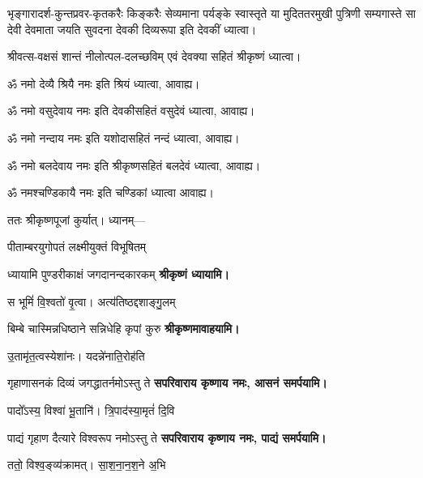 \begin{center}

{भृङ्गारादर्श-कुन्तप्रवर-कृतकरैः किङ्करैः सेव्यमाना}
{पर्यङ्के स्वास्तृते या मुदिततरमुखी पुत्रिणी सम्यगास्ते}
{सा देवी देवमाता जयति सुवदना देवकी दिव्यरूपा}
इति देवकीं ध्यात्वा।

{श्रीवत्स-वक्षसं शान्तं नीलोत्पल-दलच्छविम्}
एवं देवक्या सहितं श्रीकृष्णं ध्यात्वा।

ॐ नमो देव्यै श्रियै नमः इति श्रियं ध्यात्वा, आवाह्य।

ॐ नमो वसुदेवाय नमः इति देवकीसहितं वसुदेवं ध्यात्वा, आवाह्य।

ॐ नमो नन्दाय नमः इति यशोदासहितं नन्दं ध्यात्वा, आवाह्य।

ॐ नमो बलदेवाय नमः इति श्रीकृष्णसहितं बलदेवं ध्यात्वा, आवाह्य।

ॐ नमश्चण्डिकायै नमः इति चण्डिकां ध्यात्वा आवाह्य।

ततः श्रीकृष्णपूजां कुर्यात्। ध्यानम्—

\renewcommand{\devAya}{सपरिवाराय कृष्णाय नमः,}
\medskip

{पीताम्बरयुगोपतं लक्ष्मीयुक्तं विभूषितम्}

{ध्यायामि पुण्डरीकाक्षं जगदानन्दकारकम्}
\medskip
\textbf{श्रीकृष्णं ध्यायामि।}

{स भूमिं॑ वि॒श्वतो॑ वृ॒त्वा। अत्य॑तिष्ठद्दशाङ्गु॒लम्}

{बिम्बे चास्मिन्नधिष्ठाने सन्निधेहि कृपां कुरु}
\textbf{श्रीकृष्णमावाहयामि।}
\medskip

{उ॒तामृ॑त॒त्वस्येशा॑नः। यदन्ने॑नाति॒रोह॑ति}

{गृहाणासनकं दिव्यं जगद्धातर्नमोऽस्तु ते}
\textbf{\devAya{} आसनं समर्पयामि।}
\medskip

{पादो᳚ऽस्य॒ विश्वा॑ भू॒तानि॑। त्रि॒पाद॑स्या॒मृतं॑ दि॒वि}

{पाद्यं गृहाण दैत्यारे विश्वरूप नमोऽस्तु ते}
\textbf{\devAya{} पाद्यं समर्पयामि।}
\medskip

{ततो॒ विश्व॒ङ्व्य॑क्रामत्। सा॒श॒ना॒न॒श॒ने अ॒भि}


\end{center}
